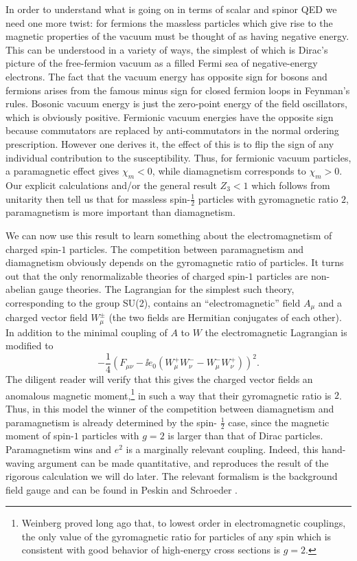 In order to understand what is going on in terms of scalar and spinor QED we
need one more twist: for fermions the massless particles which give rise to the
magnetic properties of the vacuum must be thought of as having negative energy.
This can be understood in a variety of ways, the simplest of which is Dirac's
picture of the free-fermion vacuum as a filled Fermi sea of negative-energy
electrons. The fact that the vacuum energy has opposite sign for bosons and
fermions arises from the famous minus sign for closed fermion loops in
Feynman's rules. Bosonic vacuum energy is just the zero-point energy of the
field oscillators, which is obviously positive. Fermionic vacuum energies have
the opposite sign because commutators are replaced by anti-commutators in the
normal ordering prescription. However one derives it, the effect of this is to
flip the sign of any individual contribution to the susceptibility. Thus, for
fermionic vacuum particles, a paramagnetic effect gives $\chi_m<0$, while
diamagnetism corresponds to $\chi_m>0$. Our explicit calculations and/or the
general result $Z_3<1$ which follows from unitarity then tell us that for
massless spin-$\tfrac12$ particles with gyromagnetic ratio $2$, paramagnetism
is more important than diamagnetism.

We can now use this result to learn something about the electromagnetism of
charged spin-$1$ particles. The competition between paramagnetism and
diamagnetism obviously depends on the gyromagnetic ratio of particles. It
turns out that the only renormalizable theories of charged spin-$1$ particles
are non-abelian gauge theories. The Lagrangian for the simplest such theory,
corresponding to the group SU(2), contains an ``electromagnetic'' field
$A_\mu$ and a charged vector field $W_\mu^\pm$ (the two fields are Hermitian
conjugates of each other). In addition to the minimal coupling of $A$ to $W$
the electromagnetic Lagrangian is modified to
\[
  -\frac14\left(F_{\mu\nu}-\ii e_0
  (W_\mu^+W_\nu^- - W_\mu^-W_\nu^+)\right)^2.
\]
The diligent reader will verify that this gives the charged vector fields an
anomalous magnetic moment,\footnote[15]{Weinberg \cite{banks-ref-112} proved long
ago that, to lowest order in electromagnetic couplings, the only value of the
gyromagnetic ratio for particles of any spin which is consistent with good
behavior of high-energy cross sections is $g=2$.} in such a way that their
gyromagnetic ratio is $2$. Thus, in this model the winner of the competition
between diamagnetism and paramagnetism is already determined by the spin-
$\tfrac12$ case, since the magnetic moment of spin-$1$ particles with $g=2$ is
larger than that of Dirac particles. Paramagnetism wins and $e^2$ is a
marginally relevant coupling. Indeed, this hand-waving argument can be made
quantitative, and reproduces the result of the rigorous calculation we will do
later. The relevant formalism is the background field gauge and can be found in
Peskin and Schroeder \cite{banks-ref-33}.

